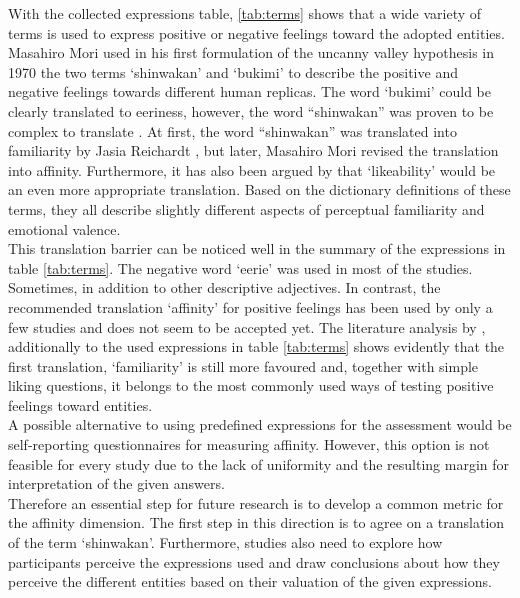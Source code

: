 With the collected expressions table, \ref{tab:terms} shows that a wide variety of terms is used to express positive or negative feelings toward the adopted entities. Masahiro Mori used in his first formulation of the uncanny valley hypothesis in 1970  \cite{original_masahiro_not_translated} the two terms `shinwakan' and `bukimi' to describe the positive and negative feelings towards different human replicas. The word `bukimi' could be clearly translated to eeriness, however, the word “shinwakan” was proven to be complex to translate \cite{quant_review}. At first, the word “shinwakan” was translated into familiarity by Jasia Reichardt \cite{first_translation}, but later, Masahiro Mori revised the translation into affinity. Furthermore, it has also been argued by \cite{uncanny_cliff} that `likeability' would be an even more appropriate translation. Based on the dictionary definitions of these terms, they all describe slightly different aspects of perceptual familiarity and emotional valence.\\
This translation barrier can be noticed well in the summary of the expressions in table \ref{tab:terms}. The negative word `eerie' was used in most of the studies. Sometimes, in addition to other descriptive adjectives. In contrast, the recommended translation `affinity' for positive feelings has been used by only a few studies and does not seem to be accepted yet. The literature analysis by \cite{quant_review}, additionally to the used expressions in table \ref{tab:terms} shows evidently that the first translation, `familiarity' is still more favoured and, together with simple liking questions, it belongs to the most commonly used ways of testing positive feelings toward entities.\\
A possible alternative to using predefined expressions for the assessment would be self-reporting questionnaires for measuring affinity. However, this option is not feasible for every study due to the lack of uniformity and the resulting margin for interpretation of the given answers.\\
Therefore an essential step for future research is to develop a common metric for the affinity dimension. The first step in this direction is to agree on a translation of the term `shinwakan'. Furthermore, studies also need to explore how participants perceive the expressions used and draw conclusions about how they perceive the different entities based on their valuation of the given expressions. 
\newpage

